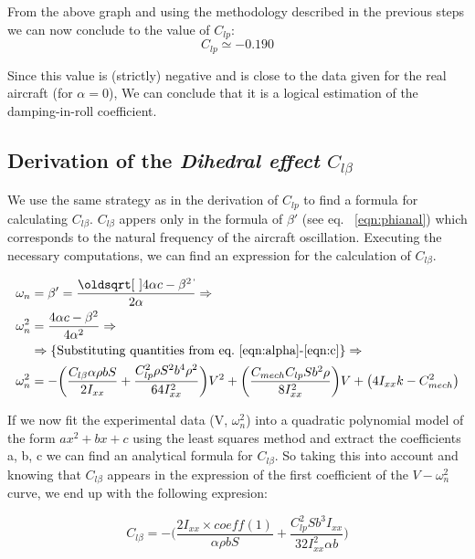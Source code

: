 \noindent From the above graph and using the methodology described in the previous steps we can now conclude to the value of $C_{lp}$:
\begin{equation}
    C_{lp} \simeq -0.190
\end{equation}

\noindent Since this value is (strictly) negative and is close to the data given for the real aircraft (for $\alpha = 0$), 
We can conclude that it is a logical estimation of the damping-in-roll coefficient.

\subsection{Derivation of the \textit{Dihedral effect} $C_{l\beta}$}

We use the same strategy as in the derivation of $C_{lp}$ to find a formula for 
calculating $C_{l\beta}$. $C_{l\beta}$ appers only in the formula of $\beta'$ (see eq. ~\ref{eqn:phianal})
which corresponds to the natural frequency of the aircraft oscillation. Executing the 
necessary computations, we can find an expression for the calculation of $C_{l\beta}$.

\begin{align}
    \omega_n &= \beta' = \frac{\sqrt{4\alpha c - \beta^2}}{2\alpha} \Rightarrow \notag\\
    \omega_n^2 &= \frac{4\alpha c - \beta^2}{4\alpha^2} \Rightarrow \notag\\
    &\Rightarrow \{\textrm{Substituting quantities from eq.~\ref{eqn:alpha}-\ref{eqn:c}} \}\Rightarrow \notag\\
    \omega_n^2 &= -\bigg(\frac{C_{l\beta}\alpha \rho bS}{2I_{xx}} + \frac{C_{lp}^2\rho S^2 b^4 \rho^2}{64I_{xx}^2}\bigg)V^2
    + \bigg(\frac{C_{mech}C_{lp}Sb^2\rho}{8I_{xx}^2}\bigg)V
    + \big(4I_{xx}k - C_{mech}^2\big) \label{eqn:wn2_V}
\end{align}

If we now fit the experimental data (V, $\omega_n^2$) into a quadratic polynomial model of the form 
$ax^2 + bx + c$ using the least squares method and extract the 
coefficients a, b, c we can find an analytical formula for $C_{l\beta}$.
So taking this into account and knowing that $C_{l\beta}$ appears in the expression
of the first coefficient of the $V-\omega_n^2$ curve, we end up with the following expresion:

\begin{equation}
    C_{l\beta} = -\bigg(\frac{2I_{xx}\times coeff(1)}{\alpha \rho bS} + 
    \frac{C_{lp}^2Sb^3I_{xx}}{32I_{xx}^2\alpha b}\bigg)
    \label{eqn:clb_calc}
\end{equation}

